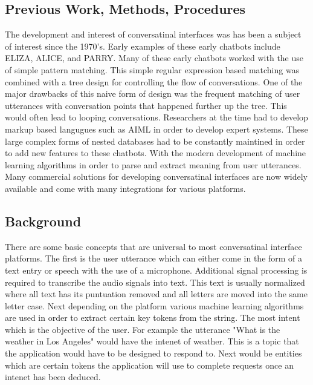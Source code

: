 \documentclass[9pt,software]{livecoms}
\begin{document}
\subsection{Previous Work, Methods, Procedures}
The development and interest of conversatinal interfaces was has been a subject of interest since the 1970's. Early examples of these
early chatbots include ELIZA, ALICE, and PARRY. Many of these early chatbots worked with the use of simple pattern matching. This simple 
regular expression based matching was combined with a tree design for controlling the flow of conversations. One of the major drawbacks of 
this naive form of design was the frequent matching of user utterances with conversation points that happened further up the tree. This 
would often lead to looping conversations. Researchers at the time had to develop markup based langugues such as AIML in order to develop 
expert systems. These large complex forms of nested databases had to be constantly maintined in order to add new features to these chatbots. 
With the modern development of machine learning algorithms in order to parse and extract meaning from user utterances. Many commercial solutions
for developing conversatinal interfaces are now widely available and come with many integrations for various platforms.

\subsection{Background}
There are some basic concepts that are universal to most conversatinal interface platforms. The first is the user utterance which can either come in 
the form of a text entry or speech with the use of a microphone. Additional signal processing is required to transcribe the audio signals into text. 
This text is usually normalized where all text has its puntuation removed and all letters are moved into the same letter case. Next depending on the 
platform various machine learning algorithms are used in order to extract certain key tokens from the string. The most intent which is the objective
of the user. For example the utterance "What is the weather in Los Angeles" would have the intenet of weather. This is a topic that the application
would have to be designed to respond to. Next would be entities which are certain tokens the application will use to complete requests once an intenet
has been deduced.

\end{document}
